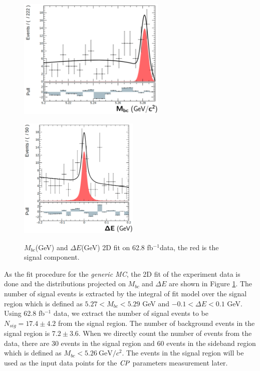 \begin{figure}[htbp]
	\begin{minipage}[b]{0.5\linewidth}
		\centering 
		\includegraphics[height=5.8cm]{figures/mbc_2d_fit}
		\label{}
	\end{minipage}
	\begin{minipage}[b]{0.5\linewidth}
		\centering 
		\includegraphics[height=5.8cm]{figures/de_2d_fit}
		\label{}
	\end{minipage}
\caption{$M_{bc}$(GeV) and $\Delta E$(GeV) 2D fit on 62.8 fb$^{-1}$data, the red is the signal component.}
\label{fig:2Ddata}
\end{figure}

As the fit procedure for the \textit{generic MC}, the 2D fit of the experiment data is done and the distributions projected on $M_{bc}$ and $\Delta E$ are shown in Figure \ref{fig:2Ddata}.  The number of signal events is extracted by the integral of fit model over the signal region which is defined as $5.27 < M_{bc} < 5.29 $ GeV and $-0.1 < \Delta E < 0.1$ GeV. Using 62.8 fb$^{-1}$ data, we extract the number of signal events to be $N_{sig} = 17.4 \pm 4.2$ from the signal region. The number of background events in the signal region is $7.2\pm 3.6$. When we directly count the number of events from the data, there are 30 events in the signal region and 60 events in the sideband region which is defined as $M_{bc} < 5.26 ~ \text{GeV}/c^2$. The events in the signal region will be used as the input data points for the $\it{CP}$ parameters measurement later.
 
